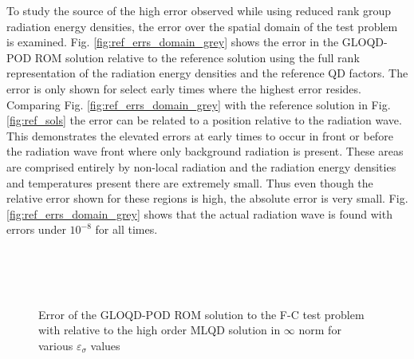 	\ind To study the source of the high error observed while using reduced rank group radiation energy densities, the error over the spatial domain of the test problem is examined. Fig. \ref{fig:ref_errs_domain_grey} shows the error in the GLOQD-POD ROM solution relative to the reference solution using the full rank representation of the radiation energy densities and the reference QD factors. The error is only shown for select early times where the highest error resides. Comparing Fig. \ref{fig:ref_errs_domain_grey} with the reference solution in Fig. \ref{fig:ref_sols} the error can be related to a position relative to the radiation wave. This demonstrates the elevated errors at early times to occur in front or before the radiation wave front where only background radiation is present. These areas are comprised entirely by non-local radiation and the radiation energy densities and temperatures present there are extremely small. Thus even though the relative error shown for these regions is high, the absolute error is very small. Fig. \ref{fig:ref_errs_domain_grey} shows that the actual radiation wave is found with errors under $10^{-8}$ for all times.
	
	\begin{figure}[ht!]
		\centering
		\\
		\\
		\\
		\caption{\label{fig:ref_errs_inf_grey}
			Error of the GLOQD-POD ROM solution to the F-C test problem with relative to the high order MLQD solution in $\infty$ norm for various $\varepsilon_\sigma$ values}
	\end{figure}

